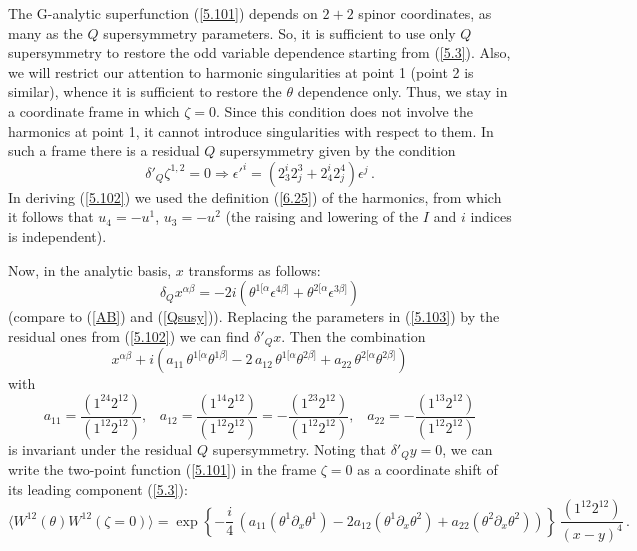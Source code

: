 \documentclass[a4paper,11pt]{article}
\begin{document}
The G-analytic superfunction (\ref{5.101}) depends on $2+2$ spinor coordinates,
as many as the $Q$ supersymmetry parameters. So, it is sufficient to use only
$Q$ supersymmetry to restore the odd variable dependence starting from
(\ref{5.3}). Also, we will restrict our attention to harmonic singularities at
point 1 (point 2 is similar), whence it is sufficient to restore the $\theta$
dependence only. Thus, we stay in a coordinate frame in which $\zeta=0$. Since
this condition does not involve the harmonics at point 1, it cannot introduce
singularities with respect to them. In such a frame there is a residual $Q$
supersymmetry given by the condition
\begin{equation}
  \delta'_Q \zeta^{1,2} = 0 \Rightarrow {\epsilon'}^i =
  (2_3^i 2^3_j + 2_4^i 2^4_j) \epsilon^j
   \label{5.102} \, .
\end{equation}
In deriving (\ref{5.102}) we used the definition (\ref{6.25}) of
the harmonics, from which it follows that $u_4 = -u^1$, $u_3 = - u^2$
(the raising and lowering of the $I$ and $i$ indices is
independent).

Now, in the analytic basis, $x$ transforms as follows:
\begin{equation}\label{5.103}
  \delta_Q x^{\alpha \beta} = -2i(\theta^{1[\alpha}
  \epsilon^{4\beta]} + \theta^{2[\alpha}
  \epsilon^{3\beta]})
\end{equation}
(compare to (\ref{AB}) and (\ref{Qsusy})). Replacing the
parameters in (\ref{5.103}) by the residual ones from
(\ref{5.102}) we can find $\delta'_Q x$. Then the combination
\begin{equation}\label{5.104}
  x^{\alpha \beta} +
  i (a_{11} \, \theta^{1[\alpha}
  \theta^{1 \beta]} - 2 \, a_{12} \, \theta^{1[\alpha}
  \theta^{2 \beta]} + a_{22} \, \theta^{2[\alpha}
  \theta^{2 \beta]} )
\end{equation}
with
\begin{equation}
a_{11} = \frac{(1^{24} 2^{12})}{(1^{12}2^{12})}, \; \; \; a_{12} =
\frac{(1^{14} 2^{12})}{(1^{12}2^{12})} = - \frac{(1^{23}
2^{12})}{(1^{12}2^{12})}, \; \; \; a_{22} = - \frac{(1^{13}
2^{12})}{(1^{12}2^{12})}
\end{equation}
is invariant under the residual $Q$ supersymmetry. Noting that
$\delta'_Q y=0$, we can write the two-point function (\ref{5.101})
in the frame $\zeta=0$ as a coordinate shift of its leading
component (\ref{5.3}):
\begin{equation} \label{5.105}
  \langle W^{12}(\theta)
  W^{12}(\zeta=0) \rangle = \exp\left\{ - \frac{i}{4} \, \left( a_{11}
  (\theta^1 \partial_x \theta^1) - 2 a_{12} (\theta^1 \partial_x \theta^2) +
a_{22} (\theta^2 \partial_x \theta^2) \right) \right\}\,
\frac{(1^{12}2^{12})}{(x-y)^4} \,.
\end{equation}
\end{document}
